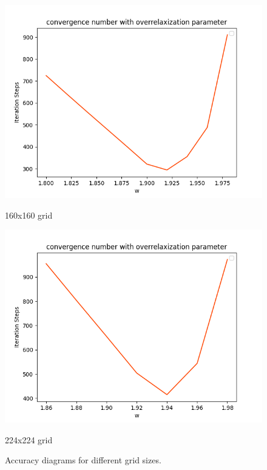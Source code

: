 \documentclass[12pt]{article}
\begin{document}
\begin{figure}[H]
    \begin{minipage}{0.45\textwidth}
        \includegraphics[width=\linewidth]{4cy160grid0.02w.png}
        \caption{160x160 grid}
        \label{fig:160grid}
    \end{minipage}
    \hfill
    \begin{minipage}{0.45\textwidth}
        \includegraphics[width=\linewidth]{4cy224grid0.02w.png}
        \caption{224x224 grid}
        \label{fig:224grid}
    \end{minipage}

    \caption{Accuracy diagrams for different grid sizes.}
    \label{fig:grids}
\end{figure}
\end{document}
